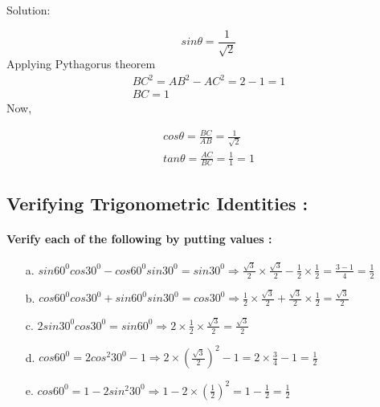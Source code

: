 \documentclass{article}
\begin{document}
\begin{enumerate}
        Solution:

        \[ sin\theta = \frac{1}{\sqrt{2}} \]
        Applying Pythagorus theorem
        \[
        \begin{aligned}
          BC^{2} = AB^{2} - AC^{2} = 2 - 1 = 1 \\
          BC = 1
        \end{aligned}
        \]
        Now,

        \[
        \begin{aligned}
          cos\theta = \frac{BC}{AB} = \frac{1}{\sqrt{2}} \\
          tan\theta = \frac{AC}{BC} = \frac{1}{1} = 1
        \end{aligned}
        \]

\end{enumerate}

\subsection{Verifying Trigonometric Identities :}
\paragraph{Verify each of the following by putting values :}

\begin{enumerate}
        \item[a.] $sin 60^{0} cos 30^{0} - cos 60^{0} sin 30^{0} = sin 30^{0} \Rightarrow \frac{\sqrt{3}}{2} \times \frac{\sqrt{3}}{2} - \frac{1}{2} \times \frac{1}{2} = \frac{3-1}{4}=\frac{1}{2}$
        \item[b.] $cos 60^{0} cos 30^{0} + sin 60^{0} sin 30^{0} = cos 30^{0} \Rightarrow \frac{1}{2} \times \frac{\sqrt{3}}{2} + \frac{\sqrt{3}}{2} \times \frac{1}{2} = \frac{\sqrt{3}}{2}$
        \item[c.] $2 sin 30^{0} cos 30^{0} = sin 60^{0} \Rightarrow 2 \times \frac{1}{2} \times \frac{\sqrt{3}}{2} = \frac{\sqrt{3}}{2}$
        \item[d.] $cos 60^{0} = 2 cos^{2} 30^{0} - 1 \Rightarrow 2 \times \left(\frac{\sqrt{3}}{2}\right)^{2} - 1 = 2 \times \frac{3}{4} - 1 = \frac{1}{2}$
        \item[e.] $cos 60^{0} = 1 - 2 sin^{2} 30^{0} \Rightarrow 1 - 2 \times \left(\frac{1}{2}\right)^{2} = 1 - \frac{1}{2} = \frac{1}{2}$
\end{enumerate}
\end{document}
